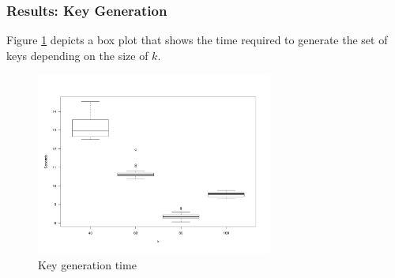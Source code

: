 \documentclass{beamer}
\begin{document}
\begin{frame}
\frametitle{Results: Key Generation}
Figure \ref{fig:boxplot} depicts a box plot that shows the time required to generate the set of keys depending on the size of $k$.
\vspace*{-5mm} 
\begin{figure}[h]
  \centerline{\includegraphics[height=6cm]{../img/experimentplot}}
  \vspace*{-5mm} 
  \caption{Key generation time}
  \label{fig:boxplot}
\end{figure}


\end{frame}
\end{document}
